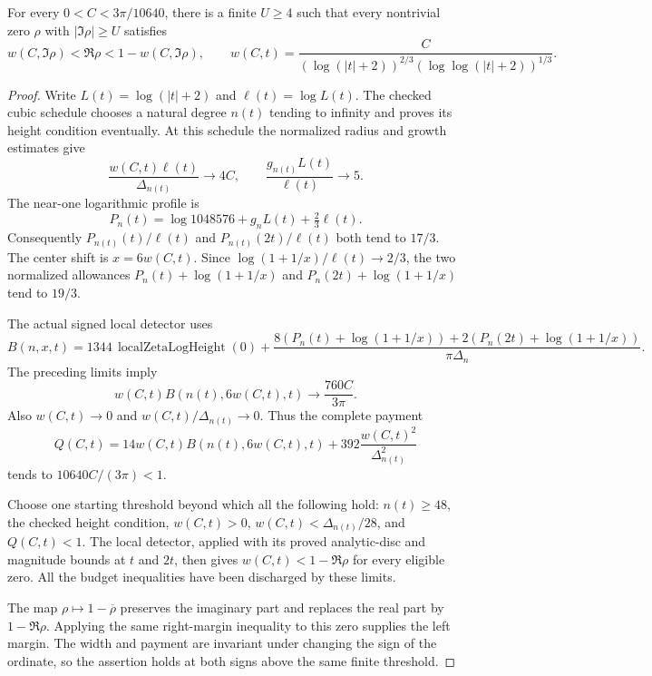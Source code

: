 \begin{theorem}
\label{analytic:vk-strip}
\leanok
For every $0<C<3\pi/10640$, there is a finite $U\ge4$ such that
every nontrivial zero $\rho$ with $|\Im\rho|\ge U$ satisfies
\[
 w(C,\Im\rho)<\Re\rho<1-w(C,\Im\rho),\qquad
 w(C,t)=
 \frac{C}{(\log(|t|+2))^{2/3}
             (\log\log(|t|+2))^{1/3}}.
\]
\end{theorem}
\begin{proof}
Write $L(t)=\log(|t|+2)$ and $\ell(t)=\log L(t)$.
The checked cubic schedule chooses a natural degree $n(t)$ tending
to infinity and proves its height condition eventually.
At this schedule the normalized radius and growth estimates give
\[
 \frac{w(C,t)\ell(t)}{\Delta_{n(t)}}\longrightarrow4C,
 \qquad
 \frac{g_{n(t)}L(t)}{\ell(t)}\longrightarrow5.
\]
The near-one logarithmic profile is
\[
 P_n(t)=\log1048576+g_nL(t)+\tfrac23\ell(t).
\]
Consequently $P_{n(t)}(t)/\ell(t)$ and
$P_{n(t)}(2t)/\ell(t)$ both tend to $17/3$.
The center shift is $x=6w(C,t)$.
Since $\log(1+1/x)/\ell(t)\to2/3$, the two normalized allowances
$P_n(t)+\log(1+1/x)$ and
$P_n(2t)+\log(1+1/x)$ tend to $19/3$.

The actual signed local detector uses
\[
 B(n,x,t)=1344\,\operatorname{localZetaLogHeight}(0)
 +\frac{8(P_n(t)+\log(1+1/x))
          +2(P_n(2t)+\log(1+1/x))}
        {\pi\Delta_n}.
\]
The preceding limits imply
\[
 w(C,t)B(n(t),6w(C,t),t)\longrightarrow
 \frac{760C}{3\pi}.
\]
Also $w(C,t)\to0$ and
$w(C,t)/\Delta_{n(t)}\to0$.  Thus the complete payment
\[
 Q(C,t)=14w(C,t)B(n(t),6w(C,t),t)
          +392\frac{w(C,t)^2}{\Delta_{n(t)}^2}
\]
tends to $10640C/(3\pi)<1$.

Choose one starting threshold beyond which all the following hold:
$n(t)\ge48$, the checked height condition, $w(C,t)>0$,
$w(C,t)<\Delta_{n(t)}/28$, and $Q(C,t)<1$.
The local detector, applied with its proved analytic-disc and
magnitude bounds at $t$ and $2t$, then gives
$w(C,t)<1-\Re\rho$ for every eligible zero.
All the budget inequalities have been discharged by these limits.

The map $\rho\mapsto1-\overline\rho$ preserves the imaginary part
and replaces the real part by $1-\Re\rho$.
Applying the same right-margin inequality to this zero supplies
the left margin.  The width and payment are invariant under
changing the sign of the ordinate, so the assertion holds at both
signs above the same finite threshold.
\end{proof}

